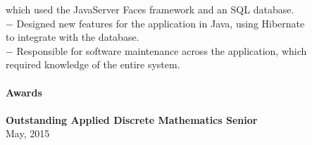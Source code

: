\begin{center}
\begin{tabbing}
	\> \> \> \> which used the JavaServer Faces framework and an SQL database. \\
	\> \> \> $-$ Designed new features for the application in Java, using Hibernate \\
	\> \> \> \> to integrate with the database. \\
	\> \> \> $-$ Responsible for software maintenance across the application, which \\
	\> \> \> \> required knowledge of the entire system.\\
	\> \\
	\textbf{\large{Awards}}    \\ \\
	\> \textbf{Outstanding Applied Discrete Mathematics Senior} \\
	\> May, 2015 \\
\end{tabbing}
\end{center}